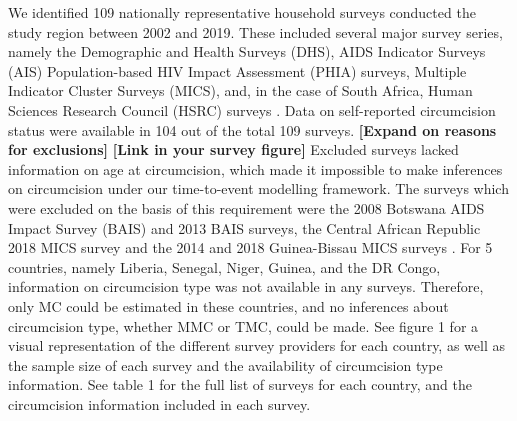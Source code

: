 \documentclass{article}
\begin{document}
\begin{appendix}
We identified 109 nationally representative household surveys conducted the study region  between 2002 and 2019. 
These included several major survey series, namely the Demographic and Health Surveys (DHS), AIDS Indicator Surveys (AIS) Population-based HIV Impact Assessment (PHIA) surveys, Multiple Indicator Cluster Surveys (MICS), and, in the case of South Africa, Human Sciences Research Council (HSRC) surveys \cite{dhs, ais, phia, hsrc2002, hsrc2008, hsrc2012, hsrc2017} .
Data on self-reported circumcision status were available in 104 out of the total 109 surveys. 
\textbf{[Expand on reasons for exclusions]} \textbf{[Link in your survey figure]} 
Excluded surveys lacked information on age at circumcision, which made it impossible to make inferences on circumcision under our time-to-event modelling framework. The surveys which were excluded on the basis of this requirement were the 2008 Botswana AIDS Impact Survey (BAIS) and 2013 BAIS surveys, the Central African Republic 2018 MICS survey and the 2014 and 2018 Guinea-Bissau MICS surveys \cite{bais2008, bais2013}.
For 5 countries, namely Liberia, Senegal, Niger, Guinea, and the DR Congo, information on circumcision type was not available in any surveys. Therefore, only MC could be estimated in these countries, and no inferences about circumcision type, whether MMC or TMC, could be made.
See figure 1 for a visual representation of the different survey providers for each country, as well as the sample size of each survey and the availability of circumcision type information. 
See table 1 for the full list of surveys for each country, and the circumcision information included in each survey. 


\end{appendix}
\end{document}
